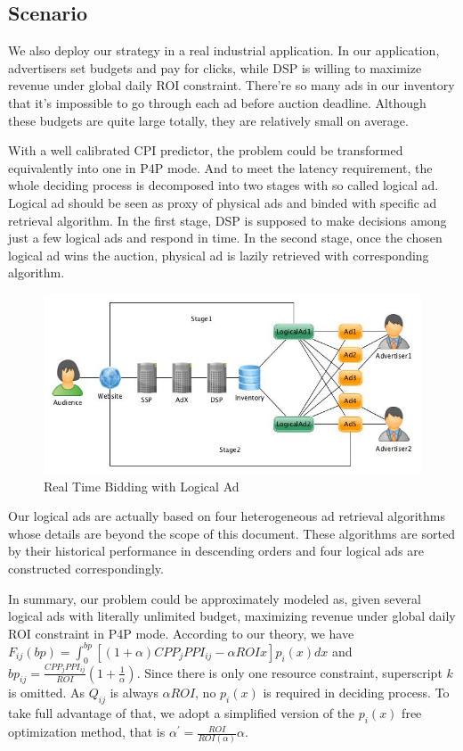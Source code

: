 \documentclass[sigconf]{acmart}
\newcommand{\sbp}{bp_{ij}}
\newcommand{\sCPP}{CPP_j}
\newcommand{\sPPI}{PPI_{ij}}
\newcommand{\sCPI}{\sCPP\sPPI}
\newcommand{\sF}{F_{ij}}
\newcommand{\dbbp}{\frac{\sCPI}{ROI}(1+\frac{1}{\alpha})}
\newcommand{\dbiter}{\alpha^{'} = \frac{ROI}{ROI(\alpha)}\alpha}
\begin{document}
\subsection{Scenario}

We also deploy our strategy in a real industrial application.
In our application, advertisers set budgets and pay for clicks, while DSP is willing to maximize revenue under global daily ROI constraint.
There're so many ads in our inventory that it's impossible to go through each ad before auction deadline.
Although these budgets are quite large totally, they are relatively small on average.

With a well calibrated CPI predictor, the problem could be transformed equivalently into one in P4P mode.
And to meet the latency requirement, the whole deciding process is decomposed into two stages with so called logical ad.
Logical ad should be seen as proxy of physical ads and binded with specific ad retrieval algorithm.
In the first stage, DSP is supposed to make decisions among just a few logical ads and respond in time.
In the second stage, once the chosen logical ad wins the auction, physical ad is lazily retrieved with corresponding algorithm.

\begin{figure}[!h]
\centering
\includegraphics[width=1.0\linewidth]{./LogicalAd.jpg}
\caption{Real Time Bidding with Logical Ad}
\end{figure}

Our logical ads are actually based on four heterogeneous ad retrieval algorithms whose details are beyond the scope of this document.
These algorithms are sorted by their historical performance in descending orders and four logical ads are constructed correspondingly.

In summary, our problem could be approximately modeled as, given several logical ads with literally unlimited budget,
    maximizing revenue under global daily ROI constraint in P4P mode.
According to our theory, we have $\sF(bp) = \int_0^{bp} [(1+\alpha)\sCPI - \alpha{}ROIx]p_i(x)dx$ and $\sbp=\dbbp$.
Since there is only one resource constraint, superscript $k$ is omitted.
As $Q_{ij}$ is always $\alpha{}ROI$, no $p_i(x)$ is required in deciding process.
To take full advantage of that, we adopt a simplified version of the $p_i(x)$ free optimization method, that is $\dbiter$.
\end{document}
